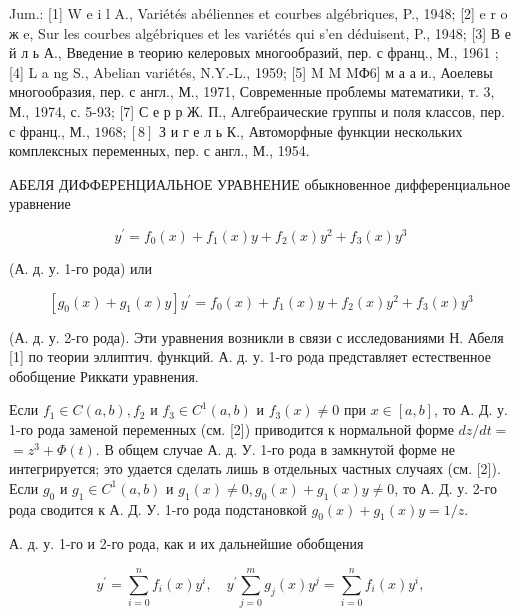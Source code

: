 \documentclass[10pt]{article}
\begin{document}
Jum.: [1] W e i l A., Variétés abéliennes et courbes algébriques, P., 1948; [2] e r o ж e, Sur les courbes algébriques et les variétés qui s'en déduisent, P., 1948; [3] В е й л ь А., Введение в теорию келеровых многообразий, пер. с франц., М., 1961 ; [4] L a ng S., Abelian variétés, N.Y.-L., 1959; [5] M M MФ6] м а а и., Аоелевы многообразия, пер. с англ., М., 1971, Современные проблемы математики, т. 3, М., 1974, с. 5-93; [7] С е р р Ж. П., Алгебраические группы и поля классов, пер. с франц., М., $1968 ;[8]$ З и г е л ь К., Автоморфные функции нескольких комплексных переменных, пер. с англ., М., 1954.



АБЕЛЯ ДИФФЕРЕНЦИАЛЬНОЕ УРАВНЕНИЕ обыкновенное дифференциальное уравнение



\[

y^{\prime}=f_{0}(x)+f_{1}(x) y+f_{2}(x) y^{2}+f_{3}(x) y^{3}

\]



(А. д. у. 1-го рода) или



\[

\left[g_{0}(x)+g_{1}(x) y\right] y^{\prime}=f_{0}(x)+f_{1}(x) y+f_{2}(x) y^{2}+f_{3}(x) y^{3}

\]



(А. д. у. 2-го рода). Эти уравнения возникли в связи с исследованиями Н. Абеля [1] по теории эллиптич. функций. А. д. у. 1-го рода представляет естественное обобщение Риккати уравнения.



Если $f_{1} \in C(a, b), f_{2}$ и $f_{3} \in C^{1}(a, b)$ и $f_{3}(x) \neq 0$ при $x \in[a, b]$, то А. Д. у. 1-го рода заменой переменных (см. [2]) приводится к нормальной форме $d z / d t=$ $=z^{3}+\Phi(t)$. В общем случае А. д. У. 1-го рода в замкнутой форме не интегрируется; это удается сделать лишь в отдельных частных случаях (см. [2]). Если $g_{0}$ и $g_{1} \in C^{1}(a, b)$ и $g_{1}(x) \neq 0, g_{0}(x)+g_{1}(x) y \neq 0$, то А. Д. у. 2-го рода сводится к А. Д. У. 1-го рода подстановкой $g_{0}(x)+g_{1}(x) y=1 / z$.



А. д. у. 1-го и 2-го рода, как и их дальнейшие обобщения



\[

y^{\prime}=\sum_{i=0}^{n} f_{i}(x) y^{i}, \quad y^{\prime} \sum_{j=0}^{m} g_{j}(x) y^{j}=\sum_{i=0}^{n} f_{i}(x) y^{i},

\]
\end{document}
